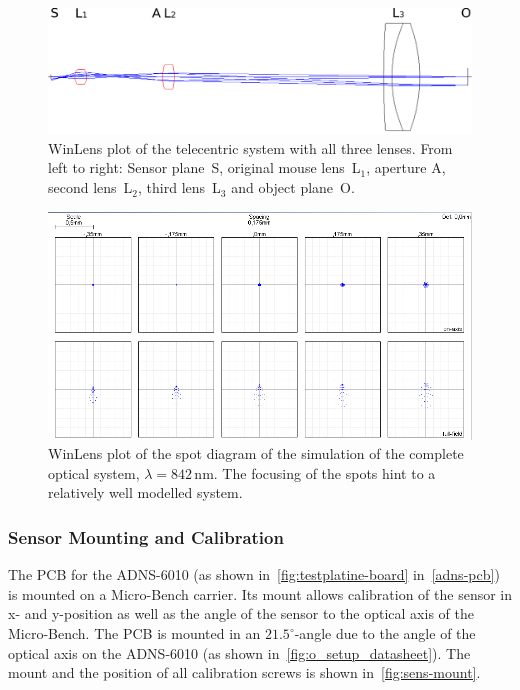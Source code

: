 \documentclass[12pt,a4paper]{article}
\begin{document}
\begin{figure}[htbp]
\begin{center}
\includegraphics[width=1\columnwidth]{figures/lens_system_telecentric.pdf}
\caption{\label{fig:ls3_p}
WinLens plot of the telecentric system with all three lenses.
From left to right:
Sensor plane~S,
original mouse lens~L$_1$,
aperture A,
second lens~L$_2$,
third lens~L$_3$ and
object plane~O.
}
\end{center}
\end{figure}

\begin{figure}[htbp]
\begin{center}
\includegraphics[width=1\columnwidth]{figures/spot_diagram_telecentric.png}
\caption{\label{fig:ls3_s}
WinLens plot of the spot diagram of the simulation of the complete optical system, $\lambda = 842$\,nm.
The focusing of the spots hint to a relatively well modelled system.
}
\end{center}
\end{figure}

\subsubsection{Sensor Mounting and Calibration}
\label{semo}

The PCB for the ADNS-6010 (as shown in~\autoref{fig:testplatine-board} in~\autoref{adns-pcb}) is mounted on a Micro-Bench carrier.
Its mount allows calibration of the sensor in x- and y-position as well as the angle of the sensor to the optical axis of the Micro-Bench.
The PCB is mounted in an $21.5^\circ$-angle due to the angle of the optical axis on the ADNS-6010 (as shown in~\autoref{fig:o_setup_datasheet}).
The mount and the position of all calibration screws is shown in~\autoref{fig:sens-mount}.
\end{document}
